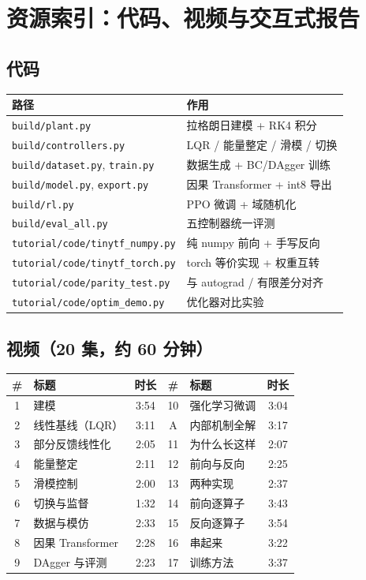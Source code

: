 \documentclass[UTF8,11pt,openany]{ctexbook}
\begin{document}
\chapter{资源索引：代码、视频与交互式报告}
\label{app:index}

\section{代码}

\begin{center}\small
\begin{tabular}{@{}ll@{}}
\toprule
路径 & 作用 \\
\midrule
\texttt{build/plant.py} & 拉格朗日建模 + RK4 积分 \\
\texttt{build/controllers.py} & LQR / 能量整定 / 滑模 / 切换 \\
\texttt{build/dataset.py}, \texttt{train.py} & 数据生成 + BC/DAgger 训练 \\
\texttt{build/model.py}, \texttt{export.py} & 因果 Transformer + int8 导出 \\
\texttt{build/rl.py} & PPO 微调 + 域随机化 \\
\texttt{build/eval\_all.py} & 五控制器统一评测 \\
\texttt{tutorial/code/tinytf\_numpy.py} & 纯 numpy 前向 + 手写反向 \\
\texttt{tutorial/code/tinytf\_torch.py} & torch 等价实现 + 权重互转 \\
\texttt{tutorial/code/parity\_test.py} & 与 autograd / 有限差分对齐 \\
\texttt{tutorial/code/optim\_demo.py} & 优化器对比实验 \\
\bottomrule
\end{tabular}
\end{center}

\section{视频（20 集，约 60 分钟）}

\begin{center}\small
\begin{tabular}{@{}clcclc@{}}
\toprule
\# & 标题 & 时长 & \# & 标题 & 时长 \\
\midrule
1 & 建模 & 3:54 & 10 & 强化学习微调 & 3:04 \\
2 & 线性基线（LQR） & 3:11 & A & 内部机制全解 & 3:17 \\
3 & 部分反馈线性化 & 2:05 & 11 & 为什么长这样 & 2:07 \\
4 & 能量整定 & 2:11 & 12 & 前向与反向 & 2:25 \\
5 & 滑模控制 & 2:00 & 13 & 两种实现 & 2:37 \\
6 & 切换与监督 & 1:32 & 14 & 前向逐算子 & 3:43 \\
7 & 数据与模仿 & 2:33 & 15 & 反向逐算子 & 3:54 \\
8 & 因果 Transformer & 2:28 & 16 & 串起来 & 3:22 \\
9 & DAgger 与评测 & 2:23 & 17 & 训练方法 & 3:37 \\
\bottomrule
\end{tabular}
\end{center}
\end{document}
